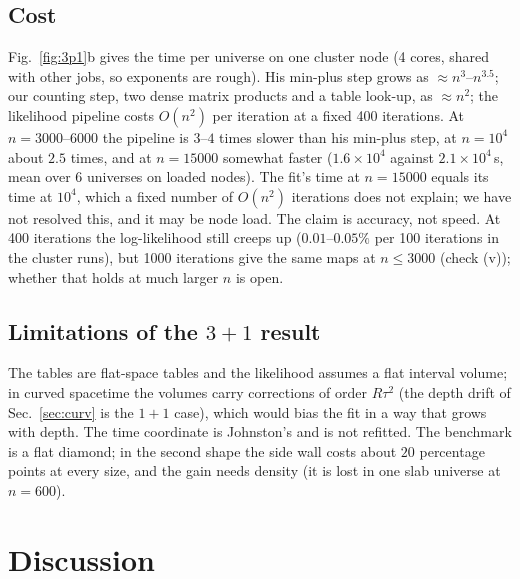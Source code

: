 \documentclass[11pt,a4paper]{article}
\begin{document}
\subsection{Cost}
Fig.~\ref{fig:3p1}b gives the time per universe on one cluster node (4 cores, shared with other jobs, so exponents are rough). His min-plus step grows as $\approx n^{3}$--$n^{3.5}$; our counting step, two dense matrix products and a table look-up, as $\approx n^{2}$; the likelihood pipeline costs $O(n^2)$ per iteration at a fixed 400 iterations. At $n=3000$--$6000$ the pipeline is $3$--$4$ times slower than his min-plus step, at $n=10^4$ about $2.5$ times, and at $n=15000$ somewhat faster ($1.6\times10^4$ against $2.1\times10^4$\,s, mean over 6 universes on loaded nodes). The fit's time at $n=15000$ equals its time at $10^4$, which a fixed number of $O(n^2)$ iterations does not explain; we have not resolved this, and it may be node load. The claim is accuracy, not speed. At 400 iterations the log-likelihood still creeps up ($0.01$--$0.05\%$ per 100 iterations in the cluster runs), but 1000 iterations give the same maps at $n\le3000$ (check (v)); whether that holds at much larger $n$ is open.

\subsection{Limitations of the $3+1$ result}
The tables are flat-space tables and the likelihood assumes a flat interval volume; in curved spacetime the volumes carry corrections of order $R\tau^2$ (the depth drift of Sec.~\ref{sec:curv} is the $1+1$ case), which would bias the fit in a way that grows with depth. The time coordinate is Johnston's and is not refitted. The benchmark is a flat diamond; in the second shape the side wall costs about $20$ percentage points at every size, and the gain needs density (it is lost in one slab universe at $n=600$).

\section{Discussion}\label{sec:disc}
\end{document}
